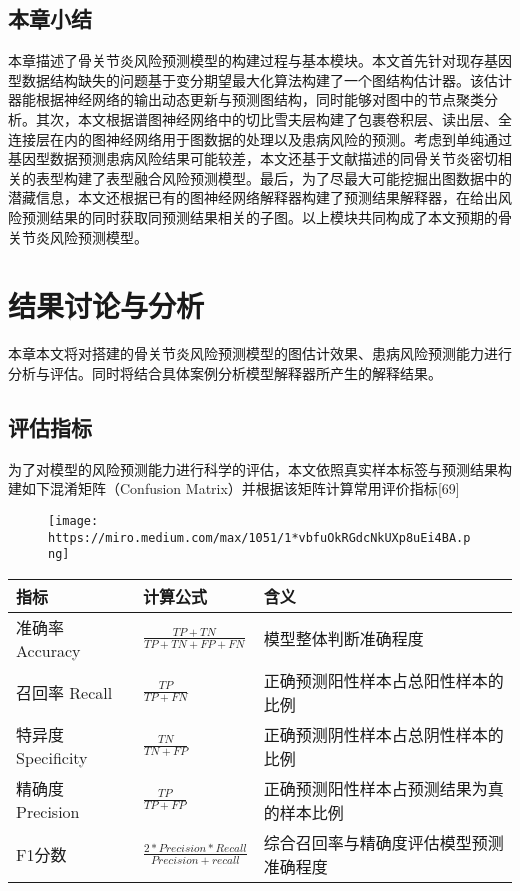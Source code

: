 \documentclass[
]{article}
\begin{document}
\hypertarget{ux672cux7ae0ux5c0fux7ed3-2}{%
\subsection{本章小结}\label{ux672cux7ae0ux5c0fux7ed3-2}}

本章描述了骨关节炎风险预测模型的构建过程与基本模块。本文首先针对现存基因型数据结构缺失的问题基于变分期望最大化算法构建了一个图结构估计器。该估计器能根据神经网络的输出动态更新与预测图结构，同时能够对图中的节点聚类分析。其次，本文根据谱图神经网络中的切比雪夫层构建了包裹卷积层、读出层、全连接层在内的图神经网络用于图数据的处理以及患病风险的预测。考虑到单纯通过基因型数据预测患病风险结果可能较差，本文还基于文献描述的同骨关节炎密切相关的表型构建了表型融合风险预测模型。最后，为了尽最大可能挖掘出图数据中的潜藏信息，本文还根据已有的图神经网络解释器构建了预测结果解释器，在给出风险预测结果的同时获取同预测结果相关的子图。以上模块共同构成了本文预期的骨关节炎风险预测模型。

\hypertarget{ux7ed3ux679cux8ba8ux8bbaux4e0eux5206ux6790}{%
\section{结果讨论与分析}\label{ux7ed3ux679cux8ba8ux8bbaux4e0eux5206ux6790}}

本章本文将对搭建的骨关节炎风险预测模型的图估计效果、患病风险预测能力进行分析与评估。同时将结合具体案例分析模型解释器所产生的解释结果。

\hypertarget{ux8bc4ux4f30ux6307ux6807}{%
\subsection{评估指标}\label{ux8bc4ux4f30ux6307ux6807}}

为了对模型的风险预测能力进行科学的评估，本文依照真实样本标签与预测结果构建如下混淆矩阵（Confusion
Matrix）并根据该矩阵计算常用评价指标{[}69{]}

\begin{figure}
\centering
\texttt{[image: https://miro.medium.com/max/1051/1*vbfuOkRGdcNkUXp8uEi4BA.png]}
\caption{}
\end{figure}

\begin{longtable}[]{@{}lll@{}}
\toprule()
指标 & 计算公式 & 含义 \\
\midrule()
\endhead
准确率 Accuracy & \(\frac{TP+TN}{TP+TN+FP+FN}\) &
模型整体判断准确程度 \\
召回率 Recall & \(\frac{TP}{TP+FN}\) &
正确预测阳性样本占总阳性样本的比例 \\
特异度 Specificity & \(\frac{TN}{TN+FP}\) &
正确预测阴性样本占总阴性样本的比例 \\
精确度 Precision & \(\frac{TP}{TP+FP}\) &
正确预测阳性样本占预测结果为真的样本比例 \\
F1分数 & \(\frac{2*Precision*Recall}{Precision+recall}\) &
综合召回率与精确度评估模型预测准确程度 \\
\bottomrule()
\end{longtable}
\end{document}
